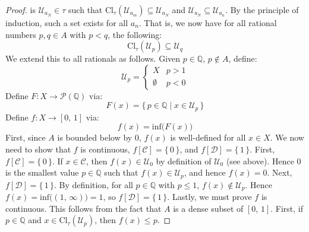\documentclass{article}
\theoremstyle{plain}
\theoremstyle{normal}
\begin{document}
\begin{proof}
            is $\mathcal{U}_{a_{N}}\in\tau$ such that
            $\textrm{Cl}_{\tau}(\mathcal{U}_{a_{m}})\subseteq\mathcal{U}_{a_{N}}$
            and $\mathcal{U}_{a_{N}}\subseteq\mathcal{U}_{a_{n}}$. By the
            principle of induction, such a set exists for all $a_{n}$. That is,
            we now have for all rational numbers $p,q\in{A}$ with $p<q$, the
            following:
            \begin{equation}
                \textrm{Cl}_{\tau}(\mathcal{U}_{p})\subseteq\mathcal{U}_{q}
            \end{equation}
            We extend this to all rationals as follows. Given
            $p\in\mathbb{Q}$, $p\not\in{A}$, define:
            \begin{equation}
                \mathcal{U}_{p}=
                \begin{cases}
                    X&p>1\\
                    \emptyset&p<0
                \end{cases}
            \end{equation}
            Define $F:X\rightarrow\mathcal{P}(\mathbb{Q})$ via:
            \begin{equation}
                F(x)=\{\,p\in\mathbb{Q}\;|\;x\in\mathcal{U}_{p}\,\}
            \end{equation}
            Define $f:X\rightarrow[0,\,1]$ via:
            \begin{equation}
                f(x)=\textrm{inf}\big(F(x)\big)
            \end{equation}
            First, since $A$ is bounded below by $0$, $f(x)$ is well-defined
            for all $x\in{X}$. We now need to show that $f$ is continuous,
            $f[\mathcal{C}]=\{\,0\,\}$, and $f[\mathcal{D}]=\{\,1\,\}$.
            First, $f[\mathcal{C}]=\{\,0\,\}$. If $x\in\mathcal{C}$, then
            $f(x)\in\mathcal{U}_{0}$ by definition of $\mathcal{U}_{0}$ (see
            above). Hence $0$ is the smallest value $p\in\mathbb{Q}$ such that
            $f(x)\in\mathcal{U}_{p}$, and hence $f(x)=0$. Next,
            $f[\mathcal{D}]=\{\,1\,\}$. By definition, for all $p\in\mathbb{Q}$
            with $p\leq{1}$, $f(x)\notin\mathcal{U}_{p}$. Hence
            $f(x)=\textrm{inf}\big((1,\,\infty)\big)=1$, so
            $f[\mathcal{D}]=\{\,1\,\}$. Lastly, we must prove $f$ is continuous.
            This follows from the fact that $A$ is a dense subset of $[0,\,1]$.
            First, if $p\in\mathbb{Q}$ and
            $x\in\textrm{Cl}_{\tau}(\mathcal{U}_{p})$, then $f(x)\leq{p}$.

\end{proof}
\end{document}
